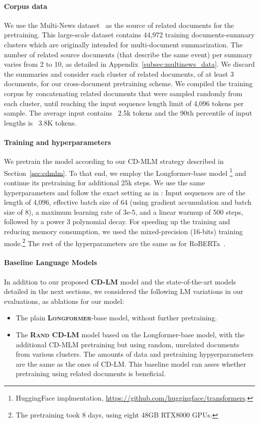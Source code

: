 \documentclass[11pt,a4paper]{article}
\begin{document}
\paragraph{Corpus data} We use the Multi-News dataset~\cite{fabbri-etal-2019-multi} as the source of related documents for the pretraining. This large-scale dataset contains 44,972 training documents-summary clusters which are originally intended for multi-document summarization. The number of related source documents (that describe the same event) per summary varies from 2 to 10, as detailed in Appendix~\ref{subsec:multinews_data}. We discard the summaries and consider each cluster of related documents, of at least 3 documents, for our cross-document pretraining scheme. We compiled the training corpus by concatenating related documents that were sampled randomly from each cluster, until reaching the input sequence length limit of 4,096 tokens per sample.  The average input contains ~2.5k tokens and the 90th percentile of input lengths is ~3.8K tokens.

\paragraph{Training and hyperparameters}
We pretrain the model according to our CD-MLM strategy described in Section~\ref{sec:cdmlm}. To that end, we employ the Longformer-base model \cite{beltagy2020longformer}\footnote{HuggingFace implmentation, \url{https://github.com/huggingface/transformers}.} and continue its pretraining for additional 25k steps. We use the same hyperparameters and follow the exact setting as in \citet{beltagy2020longformer}: Input sequences are of the length of 4,096, effective batch size of 64 (using gradient accumulation and batch size of 8), a maximum learning rate of 3e-5, and a linear warmup of 500 steps, followed by a power 3 polynomial decay. For speeding up the training and reducing memory consumption, we used the mixed-precision (16-bits) training mode.\footnote{The pretraining took 8 days, using eight 48GB RTX8000 GPUs.} The rest of the hyperparameters are the same as for RoBERTa~\cite{liu2019roberta}.

\paragraph{Baseline Language Models} In addition to our proposed \textbf{\textsc{CD-LM}} model and the state-of-the-art models detailed in the next sections, we considered the following LM variations in our evaluations, as ablations for our model:
\begin{itemize}[leftmargin=8pt]
 \setlength\itemsep{0em}
\item The plain \textbf{\textsc{Longformer}}-base model, without further pretraining.
\item The \textbf{\textsc{Rand CD-LM}} model based on the Longformer-base model, with the additional CD-MLM pretraining but using random, unrelated documents from various clusters. The amounts of data and pretraining hypyerparameters are the same as the ones of CD-LM. This baseline model can asses whether pretraining using related documents is beneficial.
\end{itemize}
\end{document}
